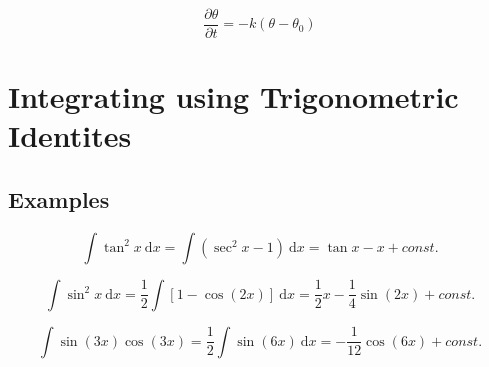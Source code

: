 \documentclass{article}
\newcommand{\C}{\textit{const.}}
\newcommand{\dx}{\:\textrm{d}x}
\begin{document}
\[\frac{\partial\theta}{\partial t}= -k (\theta - \theta_0)\]

\section{Integrating using Trigonometric Identites}

\subsection{Examples}

\[\int \tan^2 x \dx = \int \left(\sec^2 x - 1\right) \dx = \tan x - x + \C\]

\[\int \sin^2 x \dx = \frac{1}{2} \int \left[1 - \cos\left(2x\right)\right] \dx = \frac{1}{2} x - \frac{1}{4} \sin\left(2x\right) + \C\]

\[\int \sin\left(3x\right) \cos\left(3x\right) = \frac{1}{2} \int \sin\left(6x\right) \dx = -\frac{1}{12} \cos\left(6x\right) + \C \]
\end{document}
